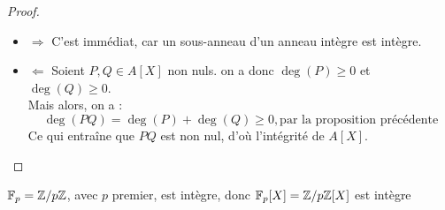 \begin{proof}
	\begin{itemize}
		\item $\Rightarrow$ C'est immédiat, car un sous-anneau d'un anneau intègre est intègre.\\
		\item $\Leftarrow$ Soient $P, Q \in A[X]$ non nuls. on a donc $\deg(P) \geqslant 0$ et $\deg(Q) \geqslant 0$.\\
		      Mais alors, on a :
		      $$ \deg(P Q)=\deg(P)+\deg(Q) \geqslant 0, \text{par la proposition précédente} $$
		      Ce qui entraîne que $P Q$ est non nul, d'où l'intégrité de $A[X]$.
	\end{itemize}
\end{proof}

\begin{example}
	$\mathbb{F}_p=\mathbb{Z}/p\mathbb{Z}$, avec $p$ premier, est intègre, donc $\mathbb{F}_p[X] = \mathbb{Z}/p\mathbb{Z}[X]$ est intègre
\end{example}
